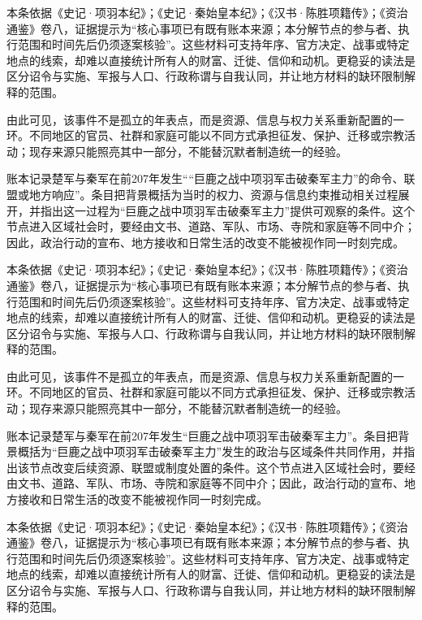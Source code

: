 本条依据《史记·项羽本纪》；《史记·秦始皇本纪》；《汉书·陈胜项籍传》；《资治通鉴》卷八，证据提示为“核心事项已有既有账本来源；本分解节点的参与者、执行范围和时间先后仍须逐案核验”。这些材料可支持年序、官方决定、战事或特定地点的线索，却难以直接统计所有人的财富、迁徙、信仰和动机。更稳妥的读法是区分诏令与实施、军报与人口、行政称谓与自我认同，并让地方材料的缺环限制解释的范围。

由此可见，该事件不是孤立的年表点，而是资源、信息与权力关系重新配置的一环。不同地区的官员、社群和家庭可能以不同方式承担征发、保护、迁移或宗教活动；现存来源只能照亮其中一部分，不能替沉默者制造统一的经验。

账本记录楚军与秦军在前207年发生““巨鹿之战中项羽军击破秦军主力”的命令、联盟或地方响应”。条目把背景概括为当时的权力、资源与信息约束推动相关过程展开，并指出这一过程为“巨鹿之战中项羽军击破秦军主力”提供可观察的条件。这个节点进入区域社会时，要经由文书、道路、军队、市场、寺院和家庭等不同中介；因此，政治行动的宣布、地方接收和日常生活的改变不能被视作同一时刻完成。

本条依据《史记·项羽本纪》；《史记·秦始皇本纪》；《汉书·陈胜项籍传》；《资治通鉴》卷八，证据提示为“核心事项已有既有账本来源；本分解节点的参与者、执行范围和时间先后仍须逐案核验”。这些材料可支持年序、官方决定、战事或特定地点的线索，却难以直接统计所有人的财富、迁徙、信仰和动机。更稳妥的读法是区分诏令与实施、军报与人口、行政称谓与自我认同，并让地方材料的缺环限制解释的范围。

由此可见，该事件不是孤立的年表点，而是资源、信息与权力关系重新配置的一环。不同地区的官员、社群和家庭可能以不同方式承担征发、保护、迁移或宗教活动；现存来源只能照亮其中一部分，不能替沉默者制造统一的经验。

账本记录楚军与秦军在前207年发生“巨鹿之战中项羽军击破秦军主力”。条目把背景概括为“巨鹿之战中项羽军击破秦军主力”发生的政治与区域条件共同作用，并指出该节点改变后续资源、联盟或制度处置的条件。这个节点进入区域社会时，要经由文书、道路、军队、市场、寺院和家庭等不同中介；因此，政治行动的宣布、地方接收和日常生活的改变不能被视作同一时刻完成。

本条依据《史记·项羽本纪》；《史记·秦始皇本纪》；《汉书·陈胜项籍传》；《资治通鉴》卷八，证据提示为“核心事项已有既有账本来源；本分解节点的参与者、执行范围和时间先后仍须逐案核验”。这些材料可支持年序、官方决定、战事或特定地点的线索，却难以直接统计所有人的财富、迁徙、信仰和动机。更稳妥的读法是区分诏令与实施、军报与人口、行政称谓与自我认同，并让地方材料的缺环限制解释的范围。

